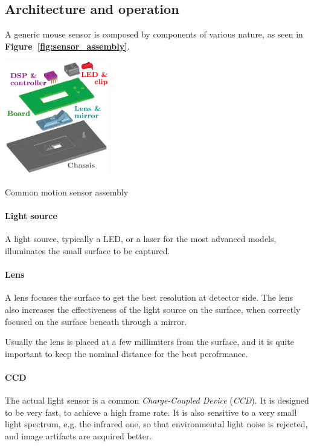 \documentclass[a4paper,10pt]{article}
\makeatletter
\newenvironment{figurehere}{\def\@captype{figure}\vspace{2ex}}{\vspace{2ex}}
\makeatother
\begin{document}
\begin{multicols}{2}
\subsection{Architecture and operation}

A generic mouse sensor is composed by components of various nature, as seen
in \textbf{Figure~\ref{fig:sensor_assembly}}.

\begin{figurehere}
	\label{fig:sensor_assembly}
	\centering
	\includegraphics[keepaspectratio=true,height=5cm]{images/sensor_assembly.pdf}
	\caption{Common motion sensor assembly}
\end{figurehere}


\paragraph{Light source}
A light source, typically a LED, or a laser for the most advanced models,
illuminates the small surface to be captured.


\paragraph{Lens}
A lens focuses the surface to get the best resolution at detector side.
The lens also increases the effectiveness of the light source on the surface,
when correctly focused on the surface beneath through a mirror.

Usually the lens is placed at a few millimiters from the surface, and
it is quite important to keep the nominal distance for the best perofrmance.


\paragraph{CCD}
The actual light sensor is a common \emph{Charge-Coupled Device}
(\emph{CCD}). It is designed to be very fast, to achieve a high frame rate.
It is also sensitive to a very small light spectrum, e.g. the infrared one,
so that environmental light noise is rejected, and image artifacts are acquired
better.


\end{multicols}
\end{document}
